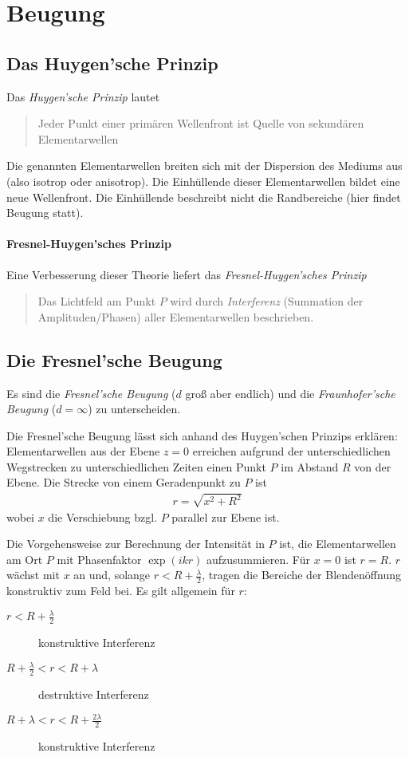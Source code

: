 \section{Beugung}
\subsection{Das Huygen'sche Prinzip}
Das \emph{Huygen'sche Prinzip} lautet
\begin{quote}
  Jeder Punkt einer primären Wellenfront ist Quelle von sekundären
  Elementarwellen
\end{quote}
Die genannten Elementarwellen breiten sich mit der Dispersion des
Mediums aus (also isotrop oder anisotrop).
Die Einhüllende dieser Elementarwellen bildet eine neue Wellenfront.
Die Einhüllende beschreibt nicht die Randbereiche (hier findet Beugung statt).

\paragraph{Fresnel-Huygen'sches Prinzip}
Eine Verbesserung dieser Theorie liefert das 
\emph{Fresnel-Huygen'sches Prinzip}
\begin{quote}
  Das Lichtfeld am Punkt $P$ wird durch \emph{Interferenz} (Summation
  der Amplituden/Phasen) aller Elementarwellen beschrieben.
\end{quote}


\subsection{Die Fresnel'sche Beugung}
Es sind die \emph{Fresnel'sche Beugung} 
($d$ groß aber endlich) und die \emph{Fraunhofer'sche Beugung}%
 ($d=\infty$) zu unterscheiden.

Die Fresnel'sche Beugung lässt sich anhand des Huygen'schen Prinzips
erklären:
Elementarwellen aus der Ebene $z=0$ erreichen aufgrund der
unterschiedlichen Wegstrecken zu unterschiedlichen Zeiten einen Punkt
$P$ im Abstand $R$ von der Ebene.
Die Strecke von einem Geradenpunkt zu $P$ ist
\begin{gather*}
  r = \sqrt{x^2+R^2}
\end{gather*}
wobei $x$ die Verschiebung bzgl. $P$ parallel zur Ebene ist.

Die Vorgehensweise zur Berechnung der Intensität in $P$ ist, die
Elementarwellen am Ort $P$ mit Phasenfaktor $\exp(ikr)$ aufzusummieren.
Für $x=0$ ist $r=R$. $r$ wächst mit $x$ an und, solange $r<R+\frac{\lambda}{2}$, tragen die
Bereiche der Blendenöffnung konstruktiv zum Feld bei.
Es gilt allgemein für $r$:
\begin{description}
\item[$r<R+\frac{\lambda}{2}$] konstruktive Interferenz
\item[$R+\frac{\lambda}{2}<r<R+\lambda$] destruktive Interferenz
\item[$R+\lambda<r<R+\frac{2\lambda}{2}$] konstruktive Interferenz
\end{description}

